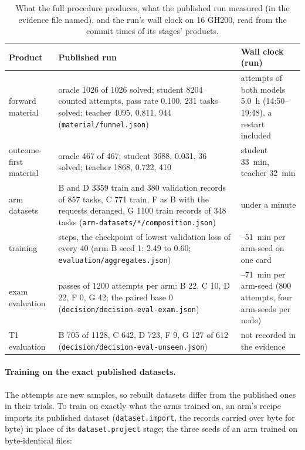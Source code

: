 \begin{table}[t]\centering\footnotesize
\caption{What the full procedure produces, what the published run measured (in the evidence file named), and the run's wall
clock on 16 GH200, read from the commit times of its stages' products.}
\label{tab:repro-vim-outputs}
\begin{tabular}{>{\raggedright\arraybackslash}p{30mm}>{\raggedright\arraybackslash}p{80mm}>{\raggedright\arraybackslash}p{34mm}}
\toprule
Product & Published run & Wall clock (run) \\
\midrule
forward material & oracle 1026 of 1026 solved; student 8204 counted attempts, pass rate 0.100, 231 tasks solved; teacher 4095,
0.811, 944 (\texttt{material/funnel.json}) & attempts of both models 5.0~h (14:50--19:48), a restart included \\
outcome-first material & oracle 467 of 467; student 3688, 0.031, 36 solved; teacher 1868, 0.722, 410 & student 33~min,
teacher 32~min \\
arm datasets & B and D 3359 train and 380 validation records of 857 tasks, C 771 train, F as B with the requests deranged, G
1100 train records of 348 tasks (\texttt{arm-datasets/*/composition.json}) & under a minute \\
training & 800 steps, the checkpoint of lowest validation loss of every 40 (arm B seed 1: 2.49 to 0.60;
\texttt{evaluation/aggregates.json}) & 16--51~min per arm-seed on one card \\
exam evaluation & passes of 1200 attempts per arm: B 22, C 10, D 22, F 0, G 42; the paired base 0
(\texttt{decision/decision-eval-exam.json}) & 49--71~min per arm-seed (800 attempts, four arm-seeds per node) \\
T1 evaluation & B 705 of 1128, C 642, D 723, F 9, G 127 of 612 (\texttt{decision/decision-eval-unseen.json}) & not recorded
in the evidence \\
\bottomrule
\end{tabular}
\end{table}

\paragraph{Training on the exact published datasets.}
The attempts are new samples, so rebuilt datasets differ from the published ones in their trials. To train on exactly what the
arms trained on, an arm's recipe imports its published dataset (\texttt{dataset.import}, the records carried over byte for byte) in place
of its \texttt{dataset.project} stage; the three seeds of an arm trained on byte-identical files:

